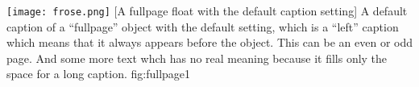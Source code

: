 \documentclass{scrartcl}
\begin{document}
\Float[capPos=after]
%
  {\texttt{[image: frose.png]}}%
  [A fullpage float with the default caption setting]%
  {A default caption of a ``fullpage'' object with the default setting, which
   is a ``left''  caption which means that it always appears before the object.
   This can be an even or odd page. And some more text whch has no
   real meaning because it fills only the space for a long caption.}%
  {fig:fullpage1}

\blinddocument


\Blindtext
\end{document}
